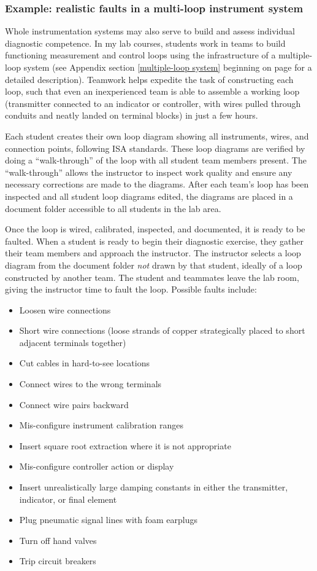 \filbreak
\subsubsection{Example: realistic faults in a multi-loop instrument system}

Whole instrumentation systems may also serve to build and assess individual diagnostic competence.  In my lab courses, students work in teams to build functioning measurement and control loops using the infrastructure of a multiple-loop system (see Appendix section \ref{multiple-loop system} beginning on page \pageref{multiple-loop system} for a detailed description).  Teamwork helps expedite the task of constructing each loop, such that even an inexperienced team is able to assemble a working loop (transmitter connected to an indicator or controller, with wires pulled through conduits and neatly landed on terminal blocks) in just a few hours.

Each student creates their own loop diagram showing all instruments, wires, and connection points, following ISA standards.  These loop diagrams are verified by doing a ``walk-through'' of the loop with all student team members present.  The ``walk-through'' allows the instructor to inspect work quality and ensure any necessary corrections are made to the diagrams.  After each team's loop has been inspected and all student loop diagrams edited, the diagrams are placed in a document folder accessible to all students in the lab area.

Once the loop is wired, calibrated, inspected, and documented, it is ready to be faulted.  When a student is ready to begin their diagnostic exercise, they gather their team members and approach the instructor.  The instructor selects a loop diagram from the document folder \textit{not} drawn by that student, ideally of a loop constructed by another team.  The student and teammates leave the lab room, giving the instructor time to fault the loop.  Possible faults include:

\begin{itemize}
\item Loosen wire connections
\item Short wire connections (loose strands of copper strategically placed to short adjacent terminals together)
\item Cut cables in hard-to-see locations
\item Connect wires to the wrong terminals
\item Connect wire pairs backward
\item Mis-configure instrument calibration ranges
\item Insert square root extraction where it is not appropriate
\item Mis-configure controller action or display
\item Insert unrealistically large damping constants in either the transmitter, indicator, or final element
\item Plug pneumatic signal lines with foam earplugs
\item Turn off hand valves
\item Trip circuit breakers
\end{itemize}

